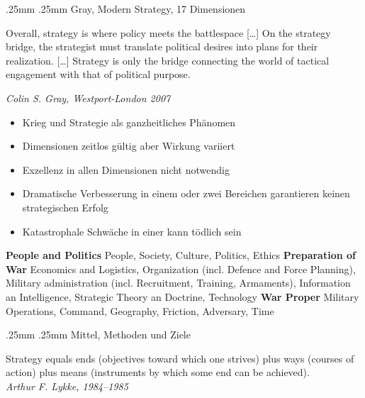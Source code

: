 {}\documentclass[a4paper,landscape,twoside]{article}
\makeatletter
\renewcommand{\subsection}{\@startsection{subsection}{2}{\z@}%
	{.25mm}%
	{.25mm}%
	{\normalfont\small\bfseries}}
\renewenvironment{quote}
{\list{}{\rightmargin0mm\leftmargin0mm}
	\item\relax\centering\arraybackslash}
{\endlist\vspace{-1mm}} %
\makeatother
\begin{document}
\begin{multicols}{4}
	\subsection{Gray, Modern Strategy, 17 Dimensionen}

	\begin{quote}
		Overall, strategy is where policy meets the battlespace {[}\ldots{]} On
		the strategy bridge, the strategist must translate political desires
		into plans for their realization. {[}\ldots{]} Strategy is only the
		bridge connecting the world of tactical engagement with that of
		political purpose.

		\emph{Colin S. Gray, Westport-London 2007}
	\end{quote}

	\begin{itemize}
		\item
		      Krieg und Strategie als ganzheitliches Phänomen
		\item
		      Dimensionen zeitlos gültig aber Wirkung variiert
		\item
		      Exzellenz in allen Dimensionen nicht notwendig
		\item
		      Dramatische Verbesserung in einem oder zwei Bereichen garantieren
		      keinen strategischen Erfolg
		\item
		      Katastrophale Schwäche in einer kann tödlich sein
	\end{itemize}

	\vspace{.4mm}
	\textbf{People and Politics}
	People,
	Society,
	Culture,
	Politics,
	Ethics
	\textbf{  Preparation of War}
	Economics and Logistics,
	Organization (incl. Defence and Force Planning),
	Military administration (incl. Recruitment, Training, Armaments),
	Information an Intelligence,
	Strategic Theory an Doctrine,
	Technology
	\textbf{ War Proper}
	Military Operations,
	Command,
	Geography,
	Friction,
	Adversary,
	Time

	\subsection{Mittel, Methoden und Ziele}

	\begin{quote}
		Strategy equals ends (objectives toward which one strives) plus ways
		(courses of action) plus means (instruments by which some end can be
		achieved).\\
		\emph{Arthur F. Lykke, 1984--1985}
	\end{quote}


\end{multicols}
\end{document}
